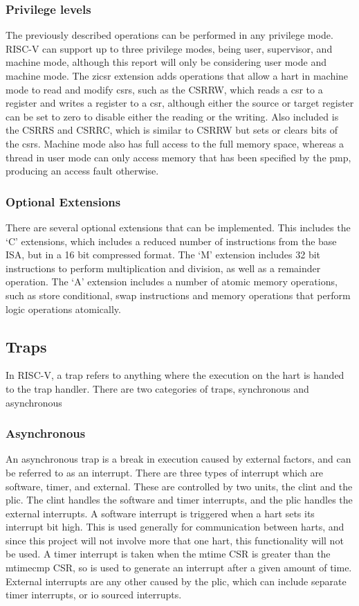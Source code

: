 \subsubsection{Privilege levels}
The previously described operations can be performed in any privilege mode. RISC-V can support up to three privilege modes, being user, supervisor, and machine mode, although this report will only be considering user mode and machine mode. The zicsr extension adds operations that allow a hart in machine mode to read and modify \ac{csrs}, such as the CSRRW, which reads a csr to a register and writes a register to a csr, although either the source or target register can be set to zero to disable either the reading or the writing. Also included is the CSRRS and CSRRC, which is similar to CSRRW but sets or clears bits of the \ac{csrs}. Machine mode also has full access to the full memory space, whereas a thread in user mode can only access memory that has been specified by the \ac{pmp}, producing an access fault otherwise\cite{riscv_unpriv}\cite{riscv_priv}.
\subsubsection{Optional Extensions}
There are several optional extensions that can be implemented. This includes the `C' extensions, which includes a reduced number of instructions from the base ISA, but in a 16 bit compressed format. The `M' extension includes 32 bit instructions to perform multiplication and division, as well as a remainder operation. The `A' extension includes a number of atomic memory operations, such as store conditional, swap instructions and memory operations that perform logic operations atomically.
\subsection{Traps}
In RISC-V, a trap refers to anything where the execution on the hart is handed to the trap handler. There are two categories of traps, synchronous and asynchronous
\subsubsection{Asynchronous}
An asynchronous trap is a break in execution caused by external factors, and can be referred to as an interrupt. There are three types of interrupt which are software, timer, and external. These are controlled by two units, the \ac{clint} and the \ac{plic}. The \ac{clint} handles the software and timer interrupts, and the \ac{plic} handles the external interrupts. A software interrupt is triggered when a hart sets its interrupt bit high. This is used generally for communication between harts, and since this project will not involve more that one hart, this functionality will not be used. A timer interrupt is taken when the mtime CSR is greater than the mtimecmp CSR, so is used to generate an interrupt after a given amount of time. External interrupts are any other caused by the \ac{plic}, which can include separate timer interrupts, or \ac{io} sourced interrupts\cite{sifive_manual}.

